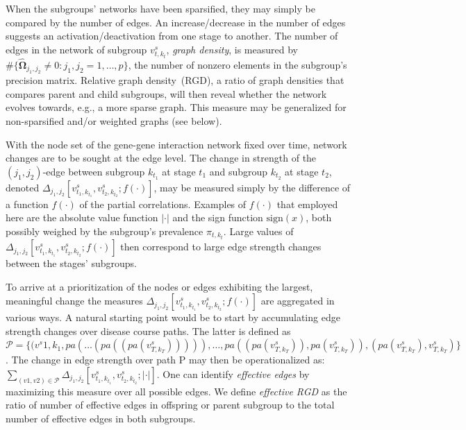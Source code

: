 \documentclass[10pt]{article}
\begin{document}
When the subgroups' networks have been sparsified, they may simply be compared by the number of edges. An increase/decrease in the number of edges suggests an activation/deactivation from one stage to another. The number of edges in the network of subgroup $v^s_{t, k_t}$, \textit{graph density}, is measured by $\# \{ \widehat{\mathbf{\Omega}}_{j_1, j_2} \not= 0 : j_1, j_2 =1, \ldots, p \}$, the number of nonzero elements in the subgroup's precision matrix. Relative graph density~(RGD), a ratio of graph densities that compares parent and child subgroups, will then reveal whether the network evolves towards, e.g., a more sparse graph. This measure may be generalized for non-sparsified and/or weighted graphs (see below).%

With the node set of the gene-gene interaction network fixed over time, network changes are to be sought at the edge level. The change in strength of the $(j_1, j_2)$-edge between subgroup $k_{t_1}$ at stage $t_1$ and subgroup $k_{t_2}$ at stage $t_2$, denoted $\Delta_{j_1,j_2} [v^s_{t_1, k_{t_1}}, v^s_{t_2, k_{t_2}}; f(\cdot)]$, may be measured simply by the difference of a function $f(\cdot)$ of the partial correlations. Examples of $f(\cdot)$ that employed here are the absolute value function $| \cdot |$ and the sign function $\mbox{sign}(x)$, both possibly weighed by the subgroup's prevalence $\pi_{t,k_t}$. Large values of $\Delta_{j_1,j_2} [v^s_{t_1, k_{t_1}}, v^s_{t_2, k_{t_2}}; f(\cdot)]$ then correspond to large edge strength changes between the stages' subgroups.

To arrive at a prioritization of the nodes or edges exhibiting the largest, meaningful change the measures $\Delta_{j_1,j_2} [v^s_{t_1, k_{t_1}}, v^s_{t_2, k_{t_2}}; f(\cdot)]$ are aggregated in various ways. A natural starting point would be to start by accumulating edge strength changes over disease course paths. The latter is defined as $\mathcal{P} = \{ (v^s{1,k_1}, pa(\ldots (pa((pa(v^s_{T,k_T} ))))), \ldots , pa((pa(v^s_{T,k_T} )), pa(v^s_{T,k_T} )), (pa(v^s_{T,k_T} ), v^s_{T,k_T} ) \}$. The change in edge strength over path P may then be operationalized as: $\sum_{(v1,v2)\in \mathcal{P}} \Delta_{j_1,j_2} [v^s_{t_1, k_{t_1}}, v^s_{t_2, k_{t_2}}; |\cdot| ]$.  One can identify \textit{effective edges} by maximizing this measure over all possible edges. We define \textit{effective RGD} as the ratio of number of effective edges in offspring or parent subgroup to the total number of effective edges in both subgroups.
\end{document}
